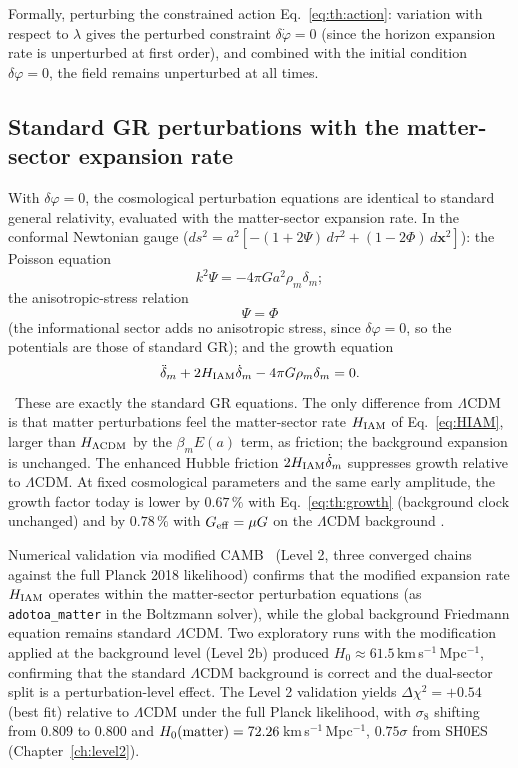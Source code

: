 Formally, perturbing the constrained action Eq.~\eqref{eq:th:action}: variation with respect to $\lambda$ gives the perturbed constraint $\delta\dot\varphi=0$
(since the horizon expansion rate is unperturbed at first order), and combined with the initial condition $\delta\varphi=0$, the field remains
unperturbed at all times. \derived

\subsection{Standard GR perturbations with the matter-sector expansion rate}
With $\delta\varphi=0$, the cosmological perturbation equations are identical to standard general relativity, evaluated with the matter-sector
expansion rate. In the conformal Newtonian gauge ($ds^2=a^2[-(1+2\Psi)\,d\tau^2+(1-2\Phi)\,d\mathbf x^2]$):
the Poisson equation
\begin{equation}k^2\Psi=-4\pi Ga^2\rho_m\delta_m ;\label{eq:th:poisson}\end{equation}
the anisotropic-stress relation
\begin{equation}\Psi=\Phi\label{eq:th:noaniso}\end{equation}
(the informational sector adds no anisotropic stress, since $\delta\varphi=0$, so the potentials are those of standard GR); and the growth equation
\begin{equation}\ddot\delta_m+2H_{\rm IAM}\dot\delta_m-4\pi G\rho_m\delta_m=0 .\label{eq:th:growth}\end{equation}
\derived\ These are exactly the standard GR equations. The only difference from $\Lambda$CDM is that matter perturbations feel the matter-sector rate
$H_{\rm IAM}$ of Eq.~\eqref{eq:HIAM}, larger than $H_{\Lambda\rm CDM}$ by the $\beta_mE(a)$ term, as friction; the background expansion is unchanged. The
enhanced Hubble friction $2H_{\rm IAM}\dot\delta_m$ suppresses growth relative to $\Lambda$CDM. At fixed cosmological parameters and the same early
amplitude, the growth factor today is lower by $0.67\,\%$ with Eq.~\eqref{eq:th:growth} (background clock unchanged) and by $0.78\,\%$ with $G_{\rm eff}=\mu G$
on the $\Lambda$CDM background \calc.

Numerical validation via modified CAMB~\cite{Lewis2000CAMB} (Level 2, three converged chains against the full Planck 2018 likelihood) confirms that the
modified expansion rate $H_{\rm IAM}$ operates within the matter-sector perturbation equations (as \texttt{adotoa\_matter} in the Boltzmann solver),
while the global background Friedmann equation remains standard $\Lambda$CDM. Two exploratory runs with the modification applied at the background
level (Level 2b) produced $H_0\approx61.5$\,km\,s$^{-1}$\,Mpc$^{-1}$, confirming that the standard $\Lambda$CDM background is correct and the dual-sector split
is a perturbation-level effect. The Level 2 validation yields $\Delta\chi^2=+0.54$ (best fit) relative to $\Lambda$CDM under the full Planck likelihood,
with $\sigma_8$ shifting from $0.809$ to $0.800$ and $H_0({\rm matter})=72.26$\,km\,s$^{-1}$\,Mpc$^{-1}$, $0.75\sigma$ from SH0ES (Chapter~\ref{ch:level2}). \measured

